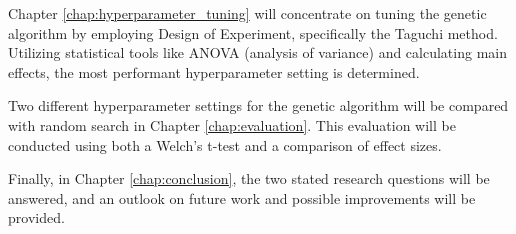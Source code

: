 Chapter \ref{chap:hyperparameter_tuning} will concentrate on tuning the genetic algorithm by employing Design of Experiment, specifically the Taguchi method. Utilizing statistical tools like ANOVA (analysis of variance) and calculating main effects, the most performant hyperparameter setting is determined.

Two different hyperparameter settings for the genetic algorithm will be compared with random search in Chapter \ref{chap:evaluation}. This evaluation will be conducted using both a Welch's t-test and a comparison of effect sizes.

Finally, in Chapter \ref{chap:conclusion}, the two stated research questions will be answered, and an outlook on future work and possible improvements will be provided.























